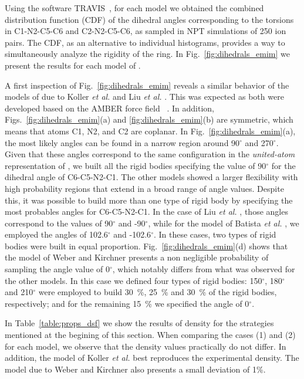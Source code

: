 \documentclass[3p,twocolumn]{elsarticle}
\begin{document}
Using the software TRAVIS~\cite{Brehm_2011}, for each model we obtained the combined distribution function (CDF) of the dihedral angles corresponding to the torsions in C1-N2-C5-C6 and C2-N2-C5-C6, as sampled in NPT simulations of 250 ion pairs. The CDF, as an alternative to individual histograms, provides a way to  simultaneously analyze the rigidity of the ring. In Fig.~\ref{fig:dihedrals_emim} we present the results for each model of \ce{[emim][B(CN)_4]}.

A first inspection of Fig.~\ref{fig:dihedrals_emim} reveals a similar behavior of the models of \ce{[emim]^+} due to Koller \textit{et al.} \cite{Koller_2012} and Liu \textit{et al.} \cite{Liu_2014}. This was expected as both were developed based on the AMBER force field ~\cite{Cornell_1995}. In addition, Figs.~\ref{fig:dihedrals_emim}(a) and \ref{fig:dihedrals_emim}(b) are symmetric, which means that atoms C1, N2, and C2 are coplanar. In Fig.~\ref{fig:dihedrals_emim}(a), the most likely angles can be found in a narrow region around 90$^{\circ}$ and 270$^{\circ}$. Given that these angles correspond to the same configuration in the \textit{united-atom} representation of \ce{[emim]^+}, we built all the rigid bodies specifying the value of 90$^{\circ}$ for the dihedral angle of C6-C5-N2-C1. The other models showed a larger flexibility with high probability regions that extend in a broad range of angle values. Despite this, it was possible to build more than one type of rigid body by specifying the most probables angles for C6-C5-N2-C1. In the case of Liu \textit{et al.} \cite{Liu_2014}, those angles correspond to the values of  90$^{\circ}$ and -90$^{\circ}$, while for the model of Batista \textit{et al.} \cite{Batista_2015}, we employed the angles of 102.6$^{\circ}$ and -102.6$^{\circ}$. In these cases, two types of rigid bodies were built in equal proportion. Fig.~\ref{fig:dihedrals_emim}(d) shows that the model of Weber and Kirchner \cite{Weber_2016} presents a non negligible probability of sampling the angle value of 0$^{\circ}$, which notably differs from what was observed for the other models. In this case we defined four types of rigid bodies: 150$^{\circ}$, 180$^{\circ}$ and 210$^{\circ}$ were employed to build 30~\%, 25~\% and 30~\% of the rigid bodies, respectively; and for the remaining 15~\% we specified the angle of 0$^{\circ}$.

In Table~\ref{table:props_dsf} we show the results of density for the strategies mentioned at the begining of this section. When comparing the cases (1) and (2) for each model, we observe that the density values practically do not differ. In addition, the model of Koller \textit{et al.} \cite{Koller_2012} best reproduces the experimental density. The model due to Weber and Kirchner also presents a small deviation of 1\%. 
\end{document}
